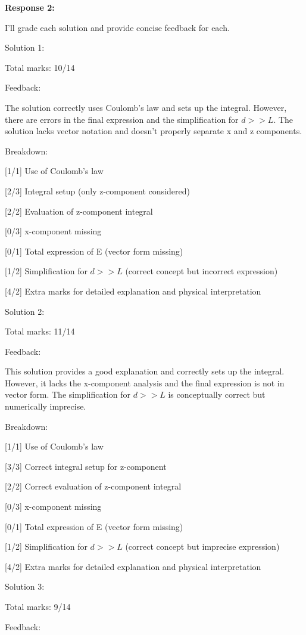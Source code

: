 \documentclass[a4paper,11pt]{article}
\begin{document}
\bigskip
\textbf{Response 2:}

I'll grade each solution and provide concise feedback for each.

Solution 1:

Total marks: 10/14

Feedback:

The solution correctly uses Coulomb's law and sets up the integral. However, there are errors in the final expression and the simplification for \(d >> L\). The solution lacks vector notation and doesn't properly separate x and z components.

Breakdown:

[1/1] Use of Coulomb's law

[2/3] Integral setup (only z-component considered)

[2/2] Evaluation of z-component integral

[0/3] x-component missing

[0/1] Total expression of E (vector form missing)

[1/2] Simplification for \(d >> L\) (correct concept but incorrect expression)

[4/2] Extra marks for detailed explanation and physical interpretation

Solution 2:

Total marks: 11/14

Feedback:

This solution provides a good explanation and correctly sets up the integral. However, it lacks the x-component analysis and the final expression is not in vector form. The simplification for \(d >> L\) is conceptually correct but numerically imprecise.

Breakdown:

[1/1] Use of Coulomb's law

[3/3] Correct integral setup for z-component

[2/2] Correct evaluation of z-component integral

[0/3] x-component missing

[0/1] Total expression of E (vector form missing)

[1/2] Simplification for \(d >> L\) (correct concept but imprecise expression)

[4/2] Extra marks for detailed explanation and physical interpretation

Solution 3:

Total marks: 9/14

Feedback:
\end{document}
